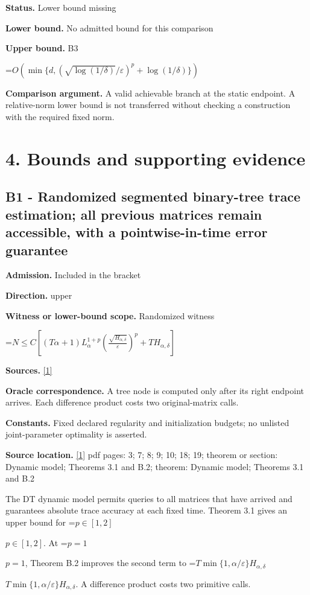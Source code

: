 \documentclass[10pt,a4paper]{article}
\newcommand{\AtlasMath}[1]{\par\begingroup\centering\setbox0=\hbox{$\displaystyle #1$}\ifdim\wd0>1.4\linewidth\typeout{ATLAS WIDE FORMULA: \the\wd0}\fi\ifdim\wd0>\linewidth\resizebox{\linewidth}{!}{\box0}\else\box0\fi\par\endgroup}
\newcommand{\AtlasInlineMath}[1]{\begingroup\setbox0=\hbox{$#1$}\ifdim\wd0>.4\linewidth\endgroup\AtlasMath{#1}\else\endgroup$#1$\fi}
\begin{document}
\textbf{Status.} Lower bound missing

\textbf{Lower bound.} No admitted bound for this comparison

\textbf{Upper bound.} B3

\AtlasMath{O\!\left(\min\{d,(\sqrt{\log(1/\delta)}/\varepsilon)^p+\log(1/\delta)\}\right)}
\textbf{Comparison argument.} A valid achievable branch at the static endpoint. A relative-norm lower bound is not transferred without checking a construction with the required fixed norm.

\section{4. Bounds and supporting evidence}
\subsection{B1 - Randomized segmented binary-tree trace estimation; all previous matrices remain accessible, with a pointwise-in-time error guarantee}
\textbf{Admission.} Included in the bracket

\textbf{Direction.} upper

\textbf{Witness or lower-bound scope.} Randomized witness

\AtlasMath{N\le C\left[(T\alpha+1)L_\alpha^{1+p}\left(\frac{\sqrt{H_{\alpha,\delta}}}{\varepsilon}\right)^p+T H_{\alpha,\delta}\right]}
\textbf{Sources.} \href{https://arxiv.org/pdf/2209.15219v1}{[1]}

\textbf{Oracle correspondence.} A tree node is computed only after its right endpoint arrives. Each difference product costs two original-matrix calls.

\textbf{Constants.} Fixed declared regularity and initialization budgets; no unlisted joint-parameter optimality is asserted.

\textbf{Source location.} \href{https://arxiv.org/pdf/2209.15219v1}{[1]} pdf pages: 3; 7; 8; 9; 10; 18; 19; theorem or section: Dynamic model; Theorems 3.1 and B.2; theorem: Dynamic model; Theorems 3.1 and B.2

The DT dynamic model permits queries to all matrices that have arrived and guarantees absolute trace accuracy at each fixed time. Theorem 3.1 gives an upper bound for \AtlasInlineMath{p\in[1,2]}. At \AtlasInlineMath{p=1}, Theorem B.2 improves the second term to \AtlasInlineMath{T\min\{1,\alpha/\varepsilon\}H_{\alpha,\delta}}. A difference product costs two primitive calls.
\end{document}
